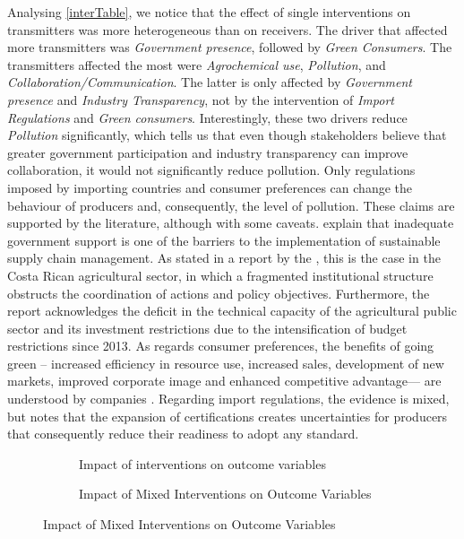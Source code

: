 Analysing \cref{interTable}, we notice that the effect of single interventions on transmitters was more heterogeneous than on receivers. The driver that affected more transmitters was \textit{Government presence}, followed by \textit{Green Consumers}. The transmitters affected the most were \textit{Agrochemical use}, \textit{Pollution}, and \textit{Collaboration/Communication}. The latter is only affected by \textit{Government presence} and \textit{Industry Transparency}, not by the intervention of \textit{Import Regulations} and \textit{Green consumers}. Interestingly, these two drivers reduce \textit{Pollution} significantly, which tells us that even though stakeholders believe that greater government participation and industry transparency can improve collaboration, it would not significantly reduce pollution. Only regulations imposed by importing countries and consumer preferences can change the behaviour of producers and, consequently, the level of pollution. These claims are supported by the literature, although with some caveats. \cite{sajjad2015sustainable} explain that inadequate government support is one of the barriers to the implementation of sustainable supply chain management. As stated in a report by the \cite{oecd2017oecd}, this is the case in the Costa Rican agricultural sector, in which a fragmented 
institutional structure obstructs the coordination of actions and policy objectives. Furthermore, the report acknowledges the deficit in the technical capacity of the agricultural public sector and its investment restrictions due to the intensification of budget restrictions since 2013. As regards consumer preferences, the benefits of going green -- increased efficiency in resource use, increased sales, development of new markets, improved corporate image and enhanced competitive advantage--- are understood by companies \citep{dangelico2010mainstreaming}. Regarding import regulations, the evidence is mixed, but \cite{montiel2019effect} notes that the expansion of certifications creates uncertainties for producers that consequently reduce their readiness to adopt any standard.

\begin{figure}[ht]
\caption{Impact of (mixed) interventions on outcome variables} \label{interBars}
\begin{subfigure}[b]{0.45\textwidth}
  \centering
  
\caption{Impact of interventions on outcome variables} 
  \label{interventionBar}
\end{subfigure}%
  \hfill
\begin{subfigure}[b]{0.45\textwidth}
  \centering
  
\caption{Impact of Mixed Interventions on Outcome Variables}    
  \label{mixedBar}
\end{subfigure}
\end{figure}

